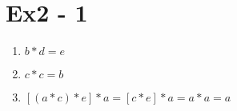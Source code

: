 \section*{Ex2 - 1}
\begin{enumerate}
    \item{$ b * d = e $ }
    \item{$ c * c = b $ }
    \item{$ [(a * c) * e] * a = [c * e] * a = a * a = a $ }
\end{enumerate}